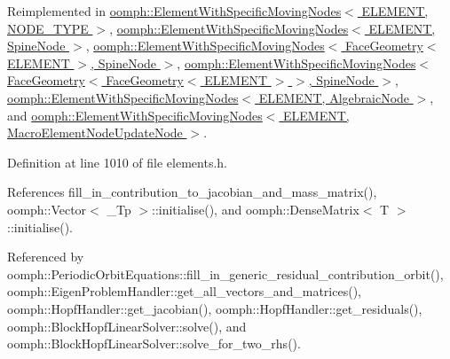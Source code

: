Reimplemented in \hyperlink{classoomph_1_1ElementWithSpecificMovingNodes_a02faf26f26815b4315d6ae82ff00da4c}{oomph\+::\+Element\+With\+Specific\+Moving\+Nodes$<$ E\+L\+E\+M\+E\+N\+T, N\+O\+D\+E\+\_\+\+T\+Y\+P\+E $>$}, \hyperlink{classoomph_1_1ElementWithSpecificMovingNodes_a02faf26f26815b4315d6ae82ff00da4c}{oomph\+::\+Element\+With\+Specific\+Moving\+Nodes$<$ E\+L\+E\+M\+E\+N\+T, Spine\+Node $>$}, \hyperlink{classoomph_1_1ElementWithSpecificMovingNodes_a02faf26f26815b4315d6ae82ff00da4c}{oomph\+::\+Element\+With\+Specific\+Moving\+Nodes$<$ Face\+Geometry$<$ E\+L\+E\+M\+E\+N\+T $>$, Spine\+Node $>$}, \hyperlink{classoomph_1_1ElementWithSpecificMovingNodes_a02faf26f26815b4315d6ae82ff00da4c}{oomph\+::\+Element\+With\+Specific\+Moving\+Nodes$<$ Face\+Geometry$<$ Face\+Geometry$<$ E\+L\+E\+M\+E\+N\+T $>$ $>$, Spine\+Node $>$}, \hyperlink{classoomph_1_1ElementWithSpecificMovingNodes_a02faf26f26815b4315d6ae82ff00da4c}{oomph\+::\+Element\+With\+Specific\+Moving\+Nodes$<$ E\+L\+E\+M\+E\+N\+T, Algebraic\+Node $>$}, and \hyperlink{classoomph_1_1ElementWithSpecificMovingNodes_a02faf26f26815b4315d6ae82ff00da4c}{oomph\+::\+Element\+With\+Specific\+Moving\+Nodes$<$ E\+L\+E\+M\+E\+N\+T, Macro\+Element\+Node\+Update\+Node $>$}.



Definition at line 1010 of file elements.\+h.



References fill\+\_\+in\+\_\+contribution\+\_\+to\+\_\+jacobian\+\_\+and\+\_\+mass\+\_\+matrix(), oomph\+::\+Vector$<$ \+\_\+\+Tp $>$\+::initialise(), and oomph\+::\+Dense\+Matrix$<$ T $>$\+::initialise().



Referenced by oomph\+::\+Periodic\+Orbit\+Equations\+::fill\+\_\+in\+\_\+generic\+\_\+residual\+\_\+contribution\+\_\+orbit(), oomph\+::\+Eigen\+Problem\+Handler\+::get\+\_\+all\+\_\+vectors\+\_\+and\+\_\+matrices(), oomph\+::\+Hopf\+Handler\+::get\+\_\+jacobian(), oomph\+::\+Hopf\+Handler\+::get\+\_\+residuals(), oomph\+::\+Block\+Hopf\+Linear\+Solver\+::solve(), and oomph\+::\+Block\+Hopf\+Linear\+Solver\+::solve\+\_\+for\+\_\+two\+\_\+rhs().

\mbox{\label{classoomph_1_1GeneralisedElement_a5be9add27c9e4a6bd05e6ccaec6263aa}} 
